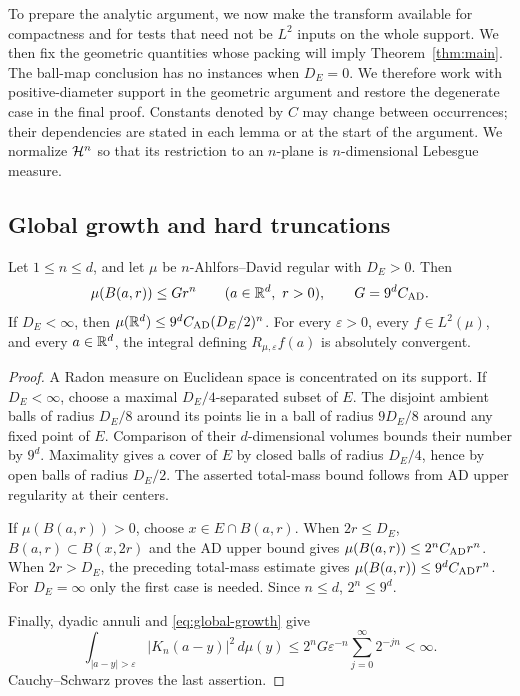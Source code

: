 To prepare the analytic argument, we now make the transform available for compactness and for tests that
need not be $L^2$ inputs on the whole support. We then fix the geometric
quantities whose packing will imply Theorem~\ref{thm:main}.
The ball-map conclusion has no instances when $D_E=0$.
We therefore work with positive-diameter support in the geometric
argument and restore the degenerate case in the final proof.
Constants denoted by $C$ may change between occurrences; their
dependencies are stated in each lemma or at the start of the argument.
We normalize $\mathcal H^n$ so that its restriction to an $n$-plane is
$n$-dimensional Lebesgue measure.

\subsection{Global growth and hard truncations}

\begin{lemma}\label{lem:global-growth}
Let $1\le n\le d$, and let $\mu$ be $n$-Ahlfors--David regular with
$D_E>0$. Then
\begin{equation}\label{eq:global-growth}
 \mu(B(a,r))\le G r^n\qquad(a\in\mathbb R^d,\ r>0),
 \qquad G=9^d C_{\rm AD}.
\end{equation}
If $D_E<\infty$, then
$\mu(\mathbb R^d)\le9^d C_{\rm AD}(D_E/2)^n$.
For every $\varepsilon>0$, every $f\in L^2(\mu)$, and every $a\in\mathbb R^d$,
the integral defining $R_{\mu,\varepsilon}f(a)$ is absolutely convergent.
\end{lemma}

\begin{proof}
A Radon measure on Euclidean space is concentrated on its support.
If $D_E<\infty$, choose a maximal $D_E/4$-separated subset of $E$.
The disjoint ambient balls of radius $D_E/8$ around its points lie in
a ball of radius $9D_E/8$ around any fixed point of $E$.
Comparison of their $d$-dimensional volumes bounds their number by
$9^d$. Maximality gives a cover of $E$ by closed balls of radius
$D_E/4$, hence by open balls of radius $D_E/2$. The asserted total-mass
bound follows from AD upper regularity at their centers.

If $\mu(B(a,r))>0$, choose $x\in E\cap B(a,r)$. When $2r\le D_E$,
$B(a,r)\subset B(x,2r)$ and the AD upper bound gives
$\mu(B(a,r))\le 2^n C_{\rm AD}r^n$. When $2r>D_E$, the preceding
total-mass estimate gives $\mu(B(a,r))\le9^dC_{\rm AD}r^n$.
For $D_E=\infty$ only the first case is needed. Since $n\le d$,
$2^n\le9^d$.

Finally, dyadic annuli and \eqref{eq:global-growth} give
\[
 \int_{|a-y|>\varepsilon}|K_n(a-y)|^2\,d\mu(y)
 \le 2^nG\varepsilon^{-n}\sum_{j=0}^{\infty}2^{-jn}<\infty.
\]
Cauchy--Schwarz proves the last assertion.
\end{proof}

